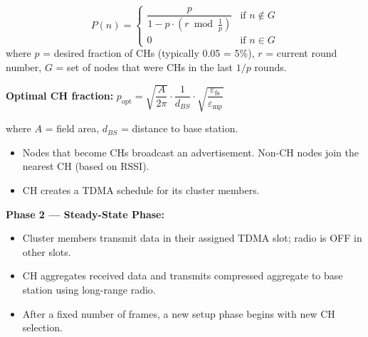 \documentclass[12pt,a4paper]{article}
\begin{document}
\begin{tcolorbox}[formulabox, title={\textbf{LEACH --- Cluster Head Probability}}]
\[
P(n) = \begin{cases}
\dfrac{p}{1 - p \cdot (r \bmod \frac{1}{p})} & \text{if } n \notin G \\
0 & \text{if } n \in G
\end{cases}
\]
where $p$ = desired fraction of CHs (typically 0.05 = 5\%), $r$ = current round number, $G$ = set of nodes that were CHs in the last $1/p$ rounds.

\textbf{Optimal CH fraction:} $p_{\text{opt}} = \sqrt{\dfrac{A}{2\pi}} \cdot \dfrac{1}{d_{BS}} \cdot \sqrt{\dfrac{\varepsilon_{\text{fs}}}{\varepsilon_{\text{mp}}}}$

where $A$ = field area, $d_{BS}$ = distance to base station.
\end{tcolorbox}

\begin{itemize}[leftmargin=*, itemsep=2pt]
  \item Nodes that become CHs broadcast an advertisement. Non-CH nodes join the nearest CH (based on RSSI).
  \item CH creates a TDMA schedule for its cluster members.
\end{itemize}

\textbf{Phase 2 --- Steady-State Phase:}
\begin{itemize}[leftmargin=*, itemsep=2pt]
  \item Cluster members transmit data in their assigned TDMA slot; radio is OFF in other slots.
  \item CH aggregates received data and transmits compressed aggregate to base station using long-range radio.
  \item After a fixed number of frames, a new setup phase begins with new CH selection.
\end{itemize}
\end{document}
